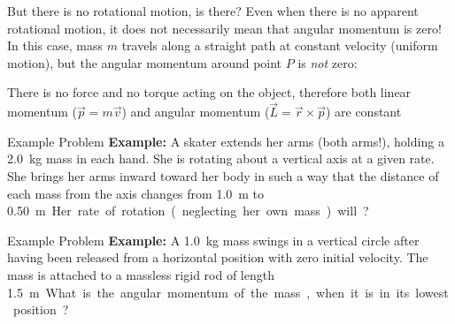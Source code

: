 \documentclass[12pt,compress,aspectratio=169]{beamer}
\begin{document}
\begin{frame}{But there is no rotational motion, is there?}
  Even when there is no apparent rotational motion, it does not necessarily
  mean that angular momentum is zero! In this case, mass $m$ travels along a
  straight path at constant velocity (uniform motion), but the angular momentum
  around point $P$ is \emph{not} zero:
  \begin{center}
  \end{center}
  There is no force and no torque acting on the object, therefore both linear
  momentum ($\vec p=m\vec v$) and angular momentum
  ($\vec L=\vec r\times\vec p$) are constant
\end{frame}



\begin{frame}{Example Problem}
  \textbf{Example:} A skater extends her arms (both arms!), holding a
  \SI{2.0}{\kilo\gram} mass in each hand. She is rotating about a vertical axis
  at a given rate. She brings her arms inward toward her body in such a way that
  the distance of each mass from the axis changes from \SI{1.0}{\metre} to
  \SI{.50}\metre. Her rate of rotation (neglecting her own mass) will?
\end{frame}




\begin{frame}{Example Problem}
  \textbf{Example:} A \SI{1.0}{\kilo\gram} mass swings in a vertical circle
  after having been released from a horizontal position with zero initial
  velocity. The mass is attached to a massless rigid rod of length
  \SI{1.5}\metre. What is the angular momentum of the mass, when it is in its
  lowest position?
\end{frame}
\end{document}
